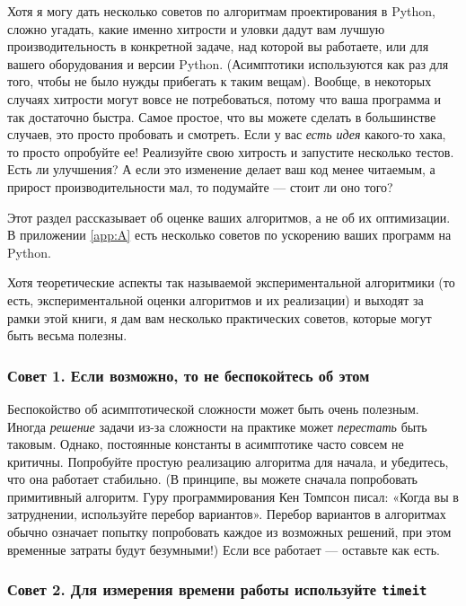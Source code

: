 Хотя я могу дать несколько советов по алгоритмам проектирования в Python, сложно угадать, какие именно хитрости и уловки дадут вам лучшую производительность в конкретной задаче, над которой вы работаете, или для вашего оборудования и версии Python. (Асимптотики используются как раз для того, чтобы не было нужды прибегать к таким вещам). Вообще, в некоторых случаях хитрости могут вовсе не потребоваться, потому что ваша программа и так достаточно быстра. Самое простое, что вы можете сделать в большинстве случаев, это просто пробовать и смотреть. Если у вас \textit{есть идея} какого-то хака, то просто опробуйте ее! Реализуйте свою хитрость и запустите несколько тестов. Есть ли улучшения? А если это изменение делает ваш код менее читаемым, а прирост производительности мал, то подумайте — стоит ли оно того?

\begin{note}
Этот раздел рассказывает об оценке ваших алгоритмов, а не об их оптимизации. В приложении \ref{app:A} есть несколько советов по ускорению ваших программ на Python.
\end{note}

Хотя теоретические аспекты так называемой экспериментальной алгоритмики (то есть, экспериментальной оценки алгоритмов и их реализации) и выходят за рамки этой книги, я дам вам несколько практических советов, которые могут быть весьма полезны.

\subsubsection*{Совет 1. Если возможно, то не беспокойтесь об этом}

Беспокойство об асимптотической сложности может быть очень полезным. Иногда \textit{решение} задачи из-за сложности на практике может \textit{перестать} быть таковым. Однако, постоянные константы в асимптотике часто совсем не критичны. Попробуйте простую реализацию алгоритма для начала, и убедитесь, что она работает стабильно. (В принципе, вы можете сначала попробовать примитивный алгоритм. Гуру программирования Кен Томпсон писал: «Когда вы в затруднении, используйте перебор вариантов». Перебор вариантов в алгоритмах обычно означает попытку попробовать каждое из возможных решений, при этом временные затраты будут безумными!) Если все работает — оставьте как есть.

\subsubsection*{Совет 2. Для измерения времени работы используйте \texttt{timeit}}

